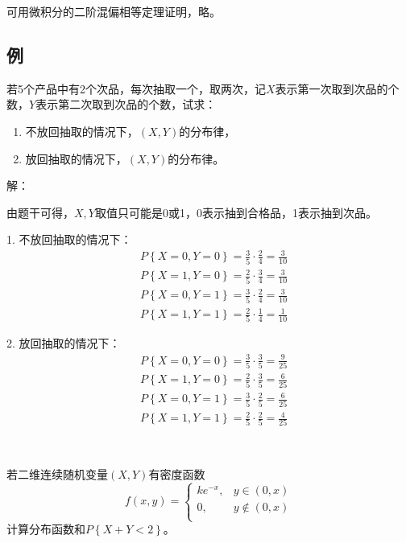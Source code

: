 可用微积分的二阶混偏相等定理证明，略。

\subsection{例}

\begin{example}
若5个产品中有2个次品，每次抽取一个，取两次，记$X$表示第一次取到次品的个数，$Y$表示第二次取到次品的个数，试求：
\begin{enumerate}
    \item 不放回抽取的情况下，$\left( X,Y \right) $的分布律，
    \item 放回抽取的情况下，$\left( X,Y \right) $的分布律。
\end{enumerate}
\end{example}

解：

由题干可得，$X,Y$取值只可能是0或1，0表示抽到合格品，1表示抽到次品。

1. 不放回抽取的情况下：
\begin{align*}
&P\left\{ X=0,Y=0 \right\} =\frac{3}{5}\cdot \frac{2}{4}=\frac{3}{10} \\
&P\left\{ X=1,Y=0 \right\} =\frac{2}{5}\cdot \frac{3}{4}=\frac{3}{10} \\
&P\left\{ X=0,Y=1 \right\} =\frac{3}{5}\cdot \frac{2}{4}=\frac{3}{10} \\
&P\left\{ X=1,Y=1 \right\} =\frac{2}{5}\cdot \frac{1}{4}=\frac{1}{10}
\end{align*}

2. 放回抽取的情况下：
\begin{align*}
&P\left\{ X=0,Y=0 \right\} =\frac{3}{5}\cdot \frac{3}{5}=\frac{9}{25} \\
&P\left\{ X=1,Y=0 \right\} =\frac{2}{5}\cdot \frac{3}{5}=\frac{6}{25} \\
&P\left\{ X=0,Y=1 \right\} =\frac{3}{5}\cdot \frac{2}{5}=\frac{6}{25} \\
&P\left\{ X=1,Y=1 \right\} =\frac{2}{5}\cdot \frac{2}{5}=\frac{4}{25}
\end{align*}

~

\begin{example}
若二维连续随机变量$\left( X,Y \right) $有密度函数
\[
f\left( x,y \right) =\begin{cases}
	ke^{-x},&		y\in \left( 0,x \right)\\
	0,&		y\notin \left( 0,x \right)\\
\end{cases}
\]
计算分布函数和$P\left\{ X+Y<2 \right\} $。
\end{example}

